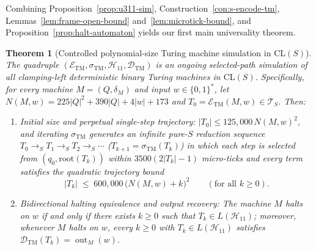 \documentclass[11pt,reqno]{amsart}
\numberwithin{equation}{section}
\theoremstyle{plain}
\newtheorem{theorem}{Theorem}[section]
\theoremstyle{definition}
\theoremstyle{remark}
\DeclareMathOperator{\out}{out}
\newcommand{\CLS}{\mathrm{CL}(S)}
\newcommand{\TS}{\mathcal{T}_S}
\newcommand{\redS}{\to_S}
\begin{document}
Combining Proposition~\ref{prop:u311-sim}, Construction~\ref{con:s-encode-tm}, Lemmas~\ref{lem:frame-open-bound} and~\ref{lem:microtick-bound}, and Proposition~\ref{prop:halt-automaton} yields our first main universality theorem.

\begin{theorem}[Controlled polynomial-size Turing machine simulation in $\CLS$]\label{thm:tm-universality}
The quadruple $(\mathcal{E}_{\mathrm{TM}}, \sigma_{\mathrm{TM}}, \mathcal{H}_{11}, \mathcal{D}_{\mathrm{TM}})$ is an ongoing selected-path simulation of all clamping-left deterministic binary Turing machines in $\CLS$. Specifically, for every machine $M = (Q, \delta_M)$ and input $w \in \{0,1\}^*$, let $N(M,w) = 225|Q|^2 + 390|Q| + 4|w| + 173$ and $T_0 = \mathcal{E}_{\mathrm{TM}}(M, w) \in \TS$. Then:
\begin{enumerate}[label=(\roman*),leftmargin=2.2em]
  \item \emph{Initial size and perpetual single-step trajectory:} $|T_0| \le 125{,}000\,N(M,w)^2$, and iterating $\sigma_{\mathrm{TM}}$ generates an infinite pure-$S$ reduction sequence $T_0 \redS T_1 \redS T_2 \redS \cdots$ ($T_{k+1} = \sigma_{\mathrm{TM}}(T_k)$) in which each step is selected from $(q_0, \mathrm{root}(T_k))$ within $3500(2|T_k|-1)$ micro-ticks and every term satisfies the quadratic trajectory bound
  \begin{equation}\label{eq:tm-traj-bound}
    |T_k| \;\le\; 600{,}000\,\bigl(N(M,w) + k\bigr)^2 \qquad (\text{for all } k \ge 0).
  \end{equation}
  \item \emph{Bidirectional halting equivalence and output recovery:} The machine $M$ halts on $w$ if and only if there exists $k \ge 0$ such that $T_k \in L(\mathcal{H}_{11})$; moreover, whenever $M$ halts on $w$, every $k \ge 0$ with $T_k \in L(\mathcal{H}_{11})$ satisfies $\mathcal{D}_{\mathrm{TM}}(T_k) = \out_M(w)$.
\end{enumerate}
\end{theorem}
\end{document}
